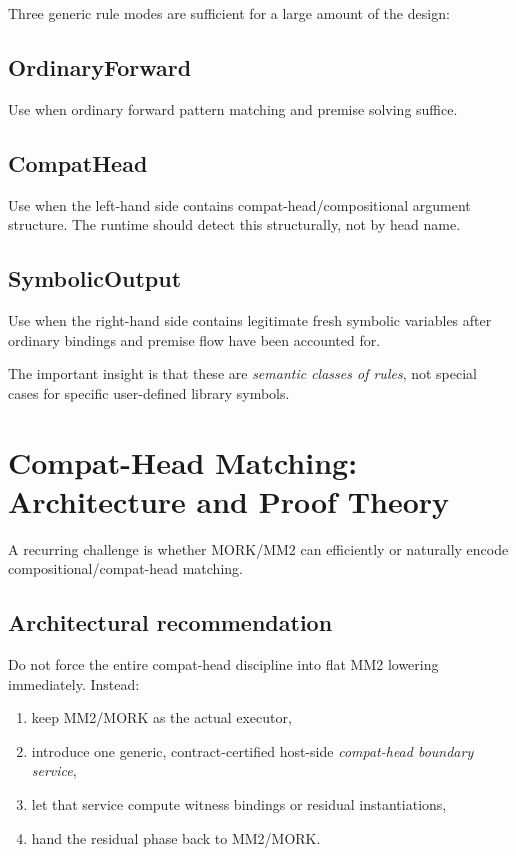 \documentclass[11pt]{article}
\begin{document}
Three generic rule modes are sufficient for a large amount of the design:

\subsection{OrdinaryForward}
Use when ordinary forward pattern matching and premise solving suffice.

\subsection{CompatHead}
Use when the left-hand side contains compat-head/compositional argument structure. The runtime should detect this structurally, not by head name.

\subsection{SymbolicOutput}
Use when the right-hand side contains legitimate fresh symbolic variables after ordinary bindings and premise flow have been accounted for.

The important insight is that these are \emph{semantic classes of rules}, not special cases for specific user-defined library symbols.

\section{Compat-Head Matching: Architecture and Proof Theory}

A recurring challenge is whether MORK/MM2 can efficiently or naturally encode compositional/compat-head matching.

\subsection{Architectural recommendation}
Do not force the entire compat-head discipline into flat MM2 lowering immediately. Instead:
\begin{enumerate}
  \item keep MM2/MORK as the actual executor,
  \item introduce one generic, contract-certified host-side \emph{compat-head boundary service},
  \item let that service compute witness bindings or residual instantiations,
  \item hand the residual phase back to MM2/MORK.
\end{enumerate}
\end{document}
